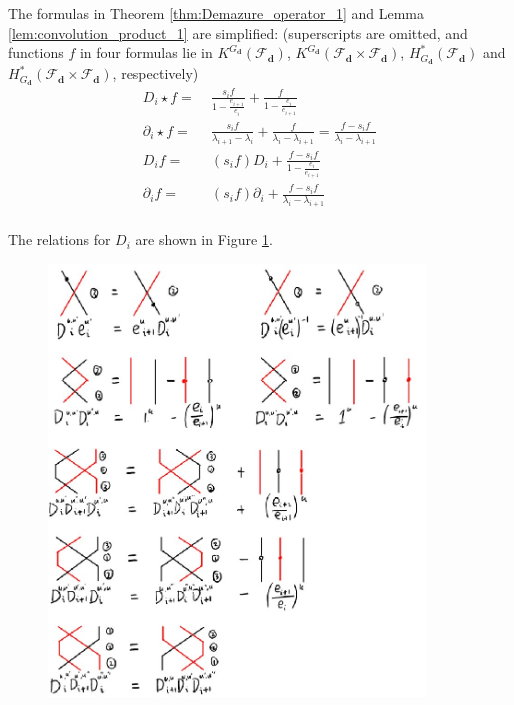 \documentclass[reqno,11pt]{book}
\numberwithin{equation}{section}
\theoremstyle{plain}
\theoremstyle{plain}
\numberwithin{equation}{section}
\theoremstyle{remark}
\newcommand{\dimvec}[1]{\mathbf{#1}}
\begin{document}
The formulas in Theorem \ref{thm:Demazure_operator_1} and Lemma \ref{lem:convolution_product_1} are simplified: (superscripts are omitted, and functions $f$ in four formulas lie in $K^{G_{\dimvec{d}}} (\mathcal{F}_{\dimvec{d}})$, $K^{G_{\dimvec{d}}} (\mathcal{F}_{\dimvec{d}} \times  \mathcal{F}_{\dimvec{d}})$, $H_{G_{\dimvec{d}}}^{*}(\mathcal{F}_{\dimvec{d}})$ and $H_{G_{\dimvec{d}}}^{*}(\mathcal{F}_{\dimvec{d}} \times  \mathcal{F}_{\dimvec{d}})$, respectively)
\begin{equation*}
\begin{aligned}
  D_i \star f =\;& \frac{s_i f}{1- \frac{e_{i+1}}{e_i}} + \frac{f}{1- \frac{e_{i}}{e_{i+1}}}\\ 
  \partial_i \star f =\;& \frac{s_i f}{\lambda_{i+1}-\lambda_{i}}+\frac{ f}{\lambda_{i}-\lambda_{i+1}}=\frac{f -s_i f}{\lambda_{i}-\lambda_{i+1}}\\
  D_i f =\;& (s_i f) D_i + \frac{f- s_i f}{1- \frac{e_{i}}{e_{i+1}}}\\ 
  \partial_i f =\;& (s_i f) \partial_i + \frac{f- s_i f}{\lambda_{i}-\lambda_{i+1}}\\   
\end{aligned}
\end{equation*}

The relations for $D_i$ are shown in Figure \ref{fig:relations_1}.
\begin{figure}[ht]
  \vspace{0cm}
    \centering  \includegraphics[width=10cm]{figures/temporary/color_wires.jpg}
    \caption{}
      \label{fig:relations_1}        
\end{figure}
\end{document}
